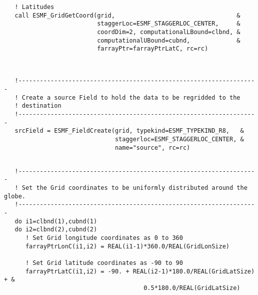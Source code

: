  \begin{verbatim}
   ! Latitudes
   call ESMF_GridGetCoord(grid,                                  &
                          staggerLoc=ESMF_STAGGERLOC_CENTER,     &
                          coordDim=2, computationalLBound=clbnd, &
                          computationalUBound=cubnd,             &
                          farrayPtr=farrayPtrLatC, rc=rc)
 
\end{verbatim}
 

 \begin{verbatim}

   !-------------------------------------------------------------------
   ! Create a source Field to hold the data to be regridded to the 
   ! destination
   !-------------------------------------------------------------------
   srcField = ESMF_FieldCreate(grid, typekind=ESMF_TYPEKIND_R8,   &
                               staggerloc=ESMF_STAGGERLOC_CENTER, &
                               name="source", rc=rc)
 
\end{verbatim}
 

 \begin{verbatim}
   !-------------------------------------------------------------------
   ! Set the Grid coordinates to be uniformly distributed around the globe. 
   !-------------------------------------------------------------------
   do i1=clbnd(1),cubnd(1)
   do i2=clbnd(2),cubnd(2)
      ! Set Grid longitude coordinates as 0 to 360
      farrayPtrLonC(i1,i2) = REAL(i1-1)*360.0/REAL(GridLonSize)

      ! Set Grid latitude coordinates as -90 to 90
      farrayPtrLatC(i1,i2) = -90. + REAL(i2-1)*180.0/REAL(GridLatSize) + &
                                       0.5*180.0/REAL(GridLatSize)
 
\end{verbatim}
 

